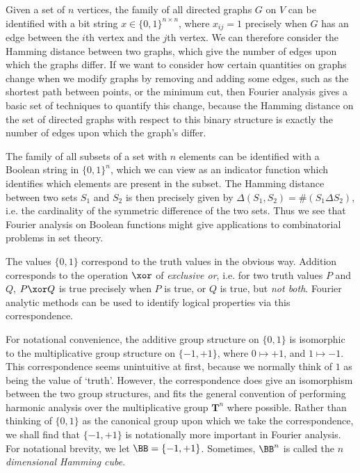 \begin{example}
    Given a set of $n$ vertices, the family of all directed graphs $G$ on $V$ can be identified with a bit string $x \in \{ 0, 1 \}^{n \times n}$, where $x_{ij} = 1$ precisely when $G$ has an edge between the $i$th vertex and the $j$th vertex. We can therefore consider the Hamming distance between two graphs, which give the number of edges upon which the graphs differ. If we want to consider how certain quantities on graphs change when we modify graphs by removing and adding some edges, such as the shortest path between points, or the minimum cut, then Fourier analysis gives a basic set of techniques to quantify this change, because the Hamming distance on the set of directed graphs with respect to this binary structure is exactly the number of edges upon which the graph's differ.
\end{example}

\begin{example}
    The family of all subsets of a set with $n$ elements can be identified with a Boolean string in $\{ 0, 1 \}^n$, which we can view as an indicator function which identifies which elements are present in the subset. The Hamming distance between two sets $S_1$ and $S_2$ is then precisely given by $\Delta(S_1,S_2) = \#(S_1 \Delta S_2)$, i.e. the cardinality of the symmetric difference of the two sets. Thus we see that Fourier analysis on Boolean functions might give applications to combinatorial problems in set theory.
\end{example}

\begin{example}
    The values $\{ 0, 1 \}$ correspond to the truth values in the obvious way. Addition corresponds to the operation $\xor$ of \emph{exclusive or}, i.e. for two truth values $P$ and $Q$, $P \xor Q$ is true precisely when $P$ is true, or $Q$ is true, but \emph{not both}. Fourier analytic methods can be used to identify logical properties via this correspondence.
\end{example}

For notational convenience, the additive group structure on $\{ 0, 1 \}$ is isomorphic to the multiplicative group structure on $\{ -1, +1 \}$, where $0 \mapsto +1$, and $1 \mapsto -1$. This correspondence seems unintuitive at first, because  we normally think of $1$ as being the value of `truth'. However, the correspondence does give an isomorphism between the two group structures, and fits the general convention of performing harmonic analysis over the multiplicative group $\mathbf{T}^n$ where possible. Rather than thinking of $\{ 0, 1 \}$ as the canonical group upon which we take the correspondence, we shall find that $\{ -1, +1 \}$ is notationally more important in Fourier analysis. For notational brevity, we let $\BB = \{ -1, +1 \}$. Sometimes, $\BB^n$ is called the \emph{$n$ dimensional Hamming cube}.

